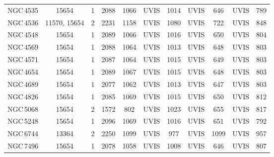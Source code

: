 \begin{table*}
\begin{center}
\begin{tabular}{lcccccccccc}
NGC\,4535 & 15654 & 1 & 2088 & 1066 & UVIS & 1014 & UVIS & 646 & UVIS & 789\\
NGC\,4536 & 11570, 15654 & 2 & 2231 & 1158 & UVIS & 1080 & UVIS & 722 & UVIS & 848\\
NGC\,4548 & 15654 & 1 & 2089 & 1066 & UVIS & 1016 & UVIS & 650 & UVIS & 804\\
NGC\,4569 & 15654 & 1 & 2088 & 1064 & UVIS & 1013 & UVIS & 648 & UVIS & 803\\
NGC\,4571 & 15654 & 1 & 2087 & 1064 & UVIS & 1015 & UVIS & 649 & UVIS & 803\\
NGC\,4654 & 15654 & 1 & 2089 & 1067 & UVIS & 1015 & UVIS & 648 & UVIS & 803\\
NGC\,4689 & 15654 & 1 & 2077 & 1062 & UVIS & 1013 & UVIS & 647 & UVIS & 803\\
NGC\,4826 & 15654 & 1 & 2085 & 1069 & UVIS & 1015 & UVIS & 650 & UVIS & 812\\
NGC\,5068 & 15654 & 2 & 1572 & 802 & UVIS & 1023 & UVIS & 655 & UVIS & 817\\
NGC\,5248 & 15654 & 1 & 2096 & 1069 & UVIS & 1016 & UVIS & 651 & UVIS & 792\\
NGC\,6744 & 13364 & 2 & 2250 & 1099 & UVIS & 977 & UVIS & 1099 & UVIS & 957\\
NGC\,7496 & 15654 & 1 & 2078 & 1058 & UVIS & 1008 & UVIS & 646 & UVIS & 807\\
\hline
\hline
\end{tabular} 
\end{center}
\end{table*}
%